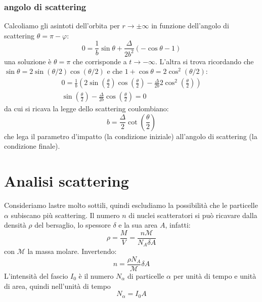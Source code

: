 \subsubsection{angolo di scattering}
Calcoliamo gli asintoti dell'orbita per $r\to\pm\infty$ in funzione dell'angolo di scattering $\theta=\pi-\varphi$:
\[
0=\frac{1}{b}\sin\theta+\frac{\Delta}{2b^2}\left(-\cos\theta-1\right)
\]
una soluzione è $\theta = \pi$ che corrisponde a $t\to -\infty$. L'altra si trova ricordando che $\sin\theta=2\sin(\theta/2)\cos(\theta/2)$ e che $1+\cos\theta=2\cos^2(\theta/2)$:
\begin{gather*}
0=\frac{1}{b}\left(2\sin\left(\frac{\theta}{2}\right)\cos\left(\frac{\theta}{2}\right)-\frac{\Delta}{2b}2\cos^2\left(\frac{\theta}{2}\right)\right)\\
\sin\left(\frac{\theta}{2}\right)-\frac{\Delta}{2b}\cos\left(\frac{\theta}{2}\right)=0
\end{gather*}
da cui si ricava la legge dello scattering coulombiano:
\begin{equation}
b=\frac{\Delta}{2}\cot\left(\frac{\theta}{2}\right)
\end{equation}
che lega il parametro d'impatto (la condizione iniziale) all'angolo di scattering (la condizione finale).
\section{Analisi scattering}
Consideriamo lastre molto sottili, quindi escludiamo la possibilità che le particelle $\alpha$ subiscano più scattering. Il numero $n$ di nuclei scatteratori si può ricavare dalla densità $\rho$ del bersaglio, lo spessore $\delta$ e la sua area $A$, infatti:
\[
\rho=\frac{M}{V}=\frac{n\mathcal{M}}{N_A\delta A}
\]
con $\mathcal{M}$ la massa molare. Invertendo:
\begin{equation}
n=\frac{\rho N_A}{\mathcal{M}}\delta A
\end{equation}
L'intensità del fascio $I_0$ è il numero $N_\alpha$ di particelle $\alpha$ per unità di tempo e unità di area, quindi nell'unità di tempo
\begin{equation}
N_\alpha=I_0A
\end{equation}

